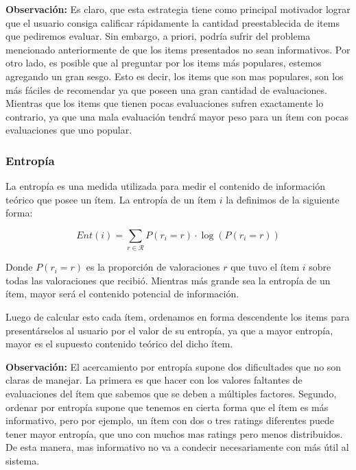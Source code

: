 \documentclass[hidelinks,12pt,a4paper]{book}
\theoremstyle{plain}
\theoremstyle{definition}
\begin{document}
\textbf{Observación:} Es claro, que esta estrategia tiene como principal motivador lograr que el usuario consiga calificar rápidamente la cantidad preestablecida de items que pediremos evaluar. Sin embargo, a priori, podría sufrir del problema mencionado anteriormente de que los items presentados no sean informativos. Por otro lado, es posible que al preguntar por los items más populares, estemos agregando un gran sesgo. Esto es decir, los items que son mas populares, son los más fáciles de recomendar ya que poseen una gran cantidad de evaluaciones. Mientras que los items que tienen pocas evaluaciones sufren exactamente lo contrario, ya que una mala evaluación tendrá mayor peso para un ítem con pocas evaluaciones que uno popular\cite{CS:rashid2002getting}.

\subsubsection{Entropía}

La entropía es una medida utilizada para medir el contenido de información teórico que posee un ítem\cite{CS:kantor1986maxentropy}\cite{CS:rashid2008learning}. La entropía de un ítem $i$ la definimos de la siguiente forma:

\begin{equation}
Ent(i)=\sum_{r\in\mathcal{R}}P(r_i=r)\cdot \log(P(r_i=r))
\end{equation}

Donde $P(r_i=r)$ es la proporción de valoraciones $r$ que tuvo el ítem $i$ sobre todas las valoraciones que recibió. Mientras más grande sea la entropía de un ítem, mayor será el contenido potencial de información\cite{CS:rashid2002getting}.

Luego de calcular esto cada ítem, ordenamos en forma descendente los items para presentárselos al usuario por el valor de su entropía, ya que a mayor entropía, mayor es el supuesto contenido teórico del dicho ítem.

\textbf{Observación:} El acercamiento por entropía supone dos dificultades que no son claras de manejar. La primera es que hacer con los valores faltantes de evaluaciones del ítem que sabemos que se deben a múltiples factores. Segundo, ordenar por entropía supone que tenemos en cierta forma que el ítem es más informativo, pero por ejemplo, un ítem con dos o tres ratings diferentes puede tener mayor entropía, que uno con muchos mas ratings pero menos distribuidos. De esta manera, mas informativo no va a condecir necesariamente con más útil al sistema.
\end{document}
